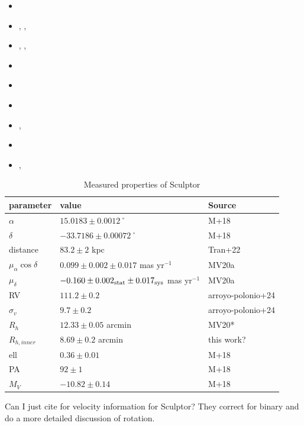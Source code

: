 \begin{itemize}
\tightlist
\item
  \citet{sestito+2023a}
\item
  \citet{tolstoy+2023}, \citet{arroyo-polonio+2023},
  \citet{arroyo-polonio+2024}
\item
  \citet{eskridge1988}, \citet{eskridge1988a}, \citet{eskridge1988b}
\item
  \citet{coleman+dacosta+bland-hawthorn2005}
\item
  \citet{DQ1994}
\item
  \citet{WMO2009}
\item
  \citet{IH1995}, \citet{munoz+2018}
\item
  \citet{kirby+2009}
\item
  \citet{martinez-vazquez+2015}, \citet{pietrzynski+2008}
\end{itemize}

\begin{table}[t]
\centering
\caption{Measured properties of Sculptor}
\label{tbl:Measured-properties-of-Sculptor}
\begin{tabular}{lll}
\toprule
parameter & value & Source\\
\midrule
$\alpha$ & $15.0183 \pm 0.0012$˚ & M+18\\
$\delta$ & $-33.7186 \pm 0.00072$˚ & M+18\\
distance & $83.2 \pm 2$ kpc & Tran+22\\
$\mu_\alpha \cos \delta$ & $0.099 \pm 0.002 \pm 0.017$ mas yr$^{-1}$ & MV20a\\
$\mu_\delta$ & $-0.160 \pm 0.002_{\rm stat} \pm 0.017_{\rm sys}$ mas yr$^{-1}$ & MV20a\\
RV & $111.2 \pm 0.2$ & arroyo-polonio+24\\
$\sigma_v$ & $9.7\pm0.2$ & arroyo-polonio+24\\
$R_h$ & $12.33 \pm 0.05$ arcmin & MV20*\\
$R_{h,inner}$ & $8.69 \pm 0.2$ arcmin & this work?\\
ell & $0.36 \pm 0.01$ & M+18\\
PA & $92\pm1$ & M+18\\
$M_V$ & $-10.82\pm0.14$ & M+18\\
\bottomrule
\end{tabular}
\end{table}

Can I just cite \citet{arroyo-polonio+2024} for velocity information for
Sculptor? They correct for binary and do a more detailed discussion of
rotation.

